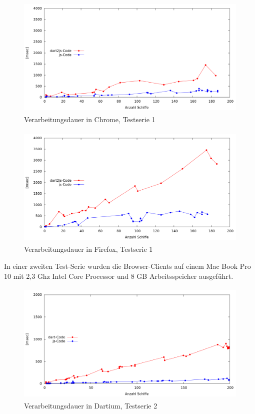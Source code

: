 \begin {figure}[H]
\begin{center}
  \includegraphics[height=2.3in]{images/Chrome.png}
\end{center}
 \caption{Verarbeitungsdauer in Chrome, Testserie 1}
\end {figure}


\begin {figure}[H]
\begin{center}
  \includegraphics[height=2.3in]{images/Firefox.png}
\end{center}
 \caption{Verarbeitungsdauer in Firefox, Testserie 1}
\end {figure}

\newpage
In einer zweiten Test-Serie wurden die Browser-Clients auf einem Mac Book Pro 10 mit 2,3 Ghz Intel Core Processor und 8 GB Arbeitsspeicher ausgeführt.
 
\begin {figure}[H]
\begin{center}
  \includegraphics[height=2.3in]{images/DartiumOnMac.png}
\end{center}
 \caption{Verarbeitungsdauer in Dartium, Testserie 2}
\end {figure}


